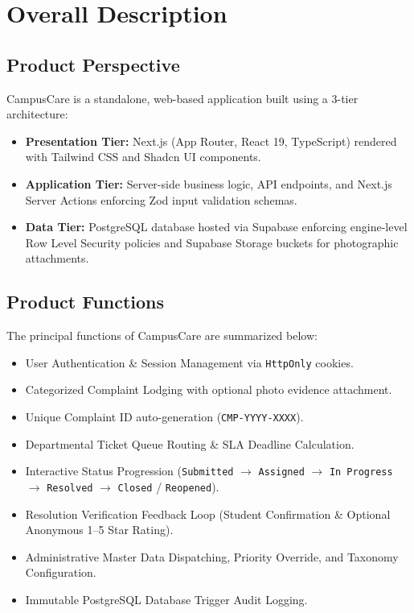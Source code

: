 \documentclass[12pt, a4paper]{article}
\begin{document}
\section{Overall Description}

\subsection{Product Perspective}
CampusCare is a standalone, web-based application built using a 3-tier architecture:
\begin{itemize}[leftmargin=*]
    \item \textbf{Presentation Tier:} Next.js (App Router, React 19, TypeScript) rendered with Tailwind CSS and Shadcn UI components.
    \item \textbf{Application Tier:} Server-side business logic, API endpoints, and Next.js Server Actions enforcing Zod input validation schemas.
    \item \textbf{Data Tier:} PostgreSQL database hosted via Supabase enforcing engine-level Row Level Security policies and Supabase Storage buckets for photographic attachments.
\end{itemize}

\subsection{Product Functions}
The principal functions of CampusCare are summarized below:
\begin{itemize}[leftmargin=*]
    \item User Authentication \& Session Management via \texttt{HttpOnly} cookies.
    \item Categorized Complaint Lodging with optional photo evidence attachment.
    \item Unique Complaint ID auto-generation (\texttt{CMP-YYYY-XXXX}).
    \item Departmental Ticket Queue Routing \& SLA Deadline Calculation.
    \item Interactive Status Progression (\texttt{Submitted} $\rightarrow$ \texttt{Assigned} $\rightarrow$ \texttt{In Progress} $\rightarrow$ \texttt{Resolved} $\rightarrow$ \texttt{Closed} / \texttt{Reopened}).
    \item Resolution Verification Feedback Loop (Student Confirmation \& Optional Anonymous 1--5 Star Rating).
    \item Administrative Master Data Dispatching, Priority Override, and Taxonomy Configuration.
    \item Immutable PostgreSQL Database Trigger Audit Logging.
\end{itemize}
\end{document}

